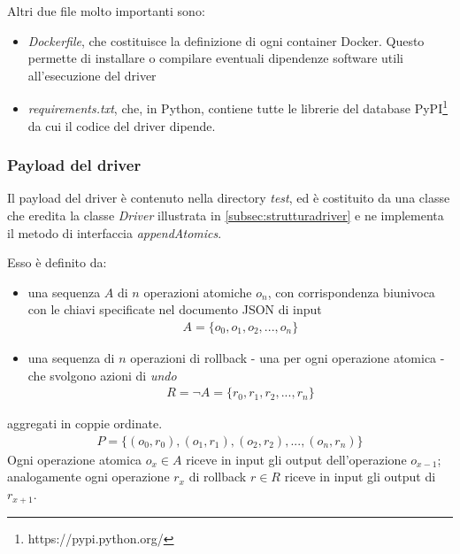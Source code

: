 \documentclass[../main.tex]{subfiles}
\begin{document}
Altri due file molto importanti sono:
\begin{itemize}
    \item \textit{Dockerfile}, che costituisce la definizione di ogni container Docker. Questo permette di installare o compilare eventuali dipendenze software utili all'esecuzione del driver 
    \item \textit{requirements.txt}, che, in Python, contiene tutte le librerie del database PyPI\footnote{https://pypi.python.org/} da cui il codice del driver dipende.
\end{itemize}


\subsubsection{Payload del driver}

\label{subsec:payload}
Il payload del driver è contenuto nella directory \textit{test}, ed è costituito da una classe che eredita la classe \textit{Driver} illustrata in \ref{subsec:strutturadriver} e ne implementa il metodo di interfaccia \textit{appendAtomics}.

Esso è definito da:
\begin{itemize}
\item una sequenza $A$ di $n$ operazioni atomiche $o_n$, con corrispondenza biunivoca con le chiavi specificate nel documento JSON di input
\begin{align*}
A = \{ o_0, o_1, o_2, ... , o_n \}
\end{align*}
\item una sequenza di $n$ operazioni di rollback - una per ogni operazione atomica - che svolgono azioni di \textit{undo}
\begin{align*}
R = \lnot A = \{ r_0, r_1, r_2, ... , r_n \}
\end{align*}
\end{itemize}
aggregati in coppie ordinate.
\begin{align*}
P = \{ (o_0, r_0), (o_1, r_1) , (o_2, r_2) , ... , (o_n, r_n)\}
\end{align*}
Ogni operazione atomica $o_x \in A$ riceve in input gli output dell'operazione $o_{x-1}$; analogamente ogni operazione $r_x$ di rollback $r \in R$ riceve in input gli output di $r_{x+1}$.
\end{document}
